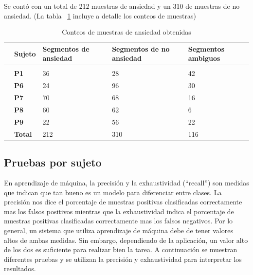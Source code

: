 Se cont\'o con un total de 212 muestras de ansiedad y un 310 de muestras de no ansiedad. (La tabla ~\ref{tab:anxietycounts} incluye a detalle los conteos de muestras)
\begin{table}[h!]
        \footnotesize
        \centering
        \caption{Conteos de muestras de ansiedad obtenidas}
\label{tab:anxietycounts}
        \begin{tabular}{m{.2cm}m{2.5cm}m{2.5cm}m{2.5cm}m{2.5cm}}
                \hline\noalign{\smallskip}
    &\textbf{Sujeto}&\textbf{Segmentos de ansiedad}&\textbf{Segmentos de no ansiedad}&\textbf{Segmentos ambiguos}\\
        \hline
 \\\noalign{\smallskip}
                &\textbf{P1}&36&28&42\\
                &\textbf{P6}&24&96&30\\
                &\textbf{P7}&70&68&16\\
                &\textbf{P8}&60&62&6\\
                &\textbf{P9}&22&56&22\\
                &\textbf{Total}&212&310&116
    \end{tabular}
\end{table}
\subsection{Pruebas por sujeto}
En aprendizaje de m\'aquina, la precisi\'on y la exhaustividad (``recall'') son medidas que indican que tan bueno es un modelo para diferenciar entre clases. La precisi\'on nos dice el porcentaje de muestras positivas clasificadas correctamente mas los falsos positivos mientras que la exhaustividad indica el porcentaje de muestras positivas clasificadas correctamente mas los falsos negativos. Por lo general, un sistema que utiliza aprendizaje de m\'aquina debe de tener valores altos de ambas medidas. Sin embargo, dependiendo de la aplicaci\'on, un valor alto de los dos es suficiente para realizar bien la tarea. A continuaci\'on se muestran diferentes pruebas y se utilizan la precisi\'on y exhaustividad para interpretar los resultados.

